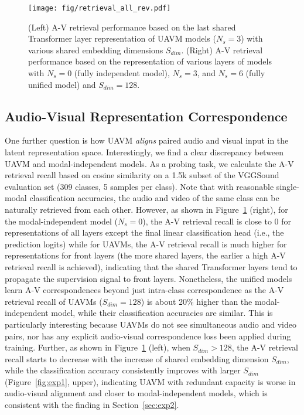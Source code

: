 \documentclass[journal]{IEEEtran}
\newcommand{\squeezeup}{\vspace{-1.6mm}}
\newcommand{\rev}[1]{{\color{dblue} #1}}
\begin{document}
\begin{figure}[]
\centering
\texttt{[image: fig/retrieval\_all\_rev.pdf]}
\vspace{-1.0em}
\caption{(Left) A-V retrieval performance based on the last shared Transformer layer representation of UAVM models ($N_s=3$) with various shared embedding dimensions $S_{dim}$. (Right) A-V retrieval performance based on the representation of various layers of models with $N_s=0$ (fully independent model), $N_s=3$, and $N_s=6$ (fully unified model) and $S_{dim}=128$.}
\label{fig:exp3}
\vspace{-1.2em}
\end{figure}

\squeezeup\squeezeup
\subsection{Audio-Visual Representation Correspondence}

\rev{One further question is how UAVM \emph{aligns} paired audio and visual input in the latent representation space. Interestingly, we find a clear discrepancy between UAVM and modal-independent models.}
As a probing task, we calculate the A-V retrieval recall based on cosine similarity on a 1.5k subset of the VGGSound evaluation set (309 classes, 5 samples per class). 
Note that with reasonable single-modal classification accuracies, the audio and video of the same class can be naturally retrieved from each other. However, as shown in Figure~\ref{fig:exp3} (right), for the modal-independent model ($N_s=0$), the A-V retrieval recall is close to 0 for representations of all layers except the final linear classification head (i.e., the prediction logits) while for UAVMs, the A-V retrieval recall is much higher for representations for front layers (the more shared layers, the earlier a high A-V retrieval recall is achieved), indicating that the shared Transformer layers \rev{tend to} propagate the supervision signal to front layers. \rev{Nonetheless, the unified models learn A-V correspondences beyond just intra-class correspondence as the A-V retrieval recall of UAVMs ($S_{dim}=128$) is about 20\% higher than the modal-independent model, while their classification accuracies are similar. This is particularly interesting because UAVMs do not see simultaneous audio and video pairs, nor has any explicit audio-visual correspondence loss been applied during training. 
Further, as shown in Figure~\ref{fig:exp3} (left), when $S_{dim}>128$, the A-V retrieval recall starts to decrease with the increase of shared embedding dimension $S_{dim}$, while the classification accuracy consistently improves with larger $S_{dim}$ (Figure~\ref{fig:exp1}, upper), indicating UAVM with redundant capacity is worse in audio-visual alignment and closer to modal-independent models, which is consistent with the finding in Section~\ref{sec:exp2}.
}
\end{document}
